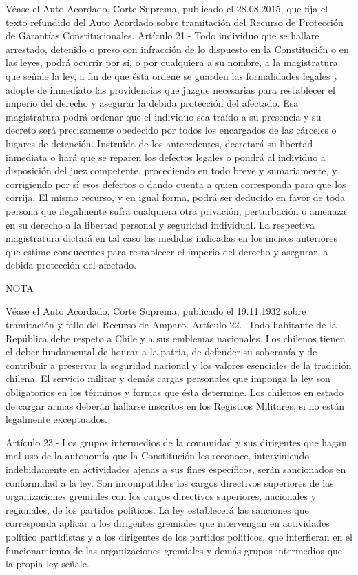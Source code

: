     Véase el Auto Acordado, Corte Suprema, publicado el 28.08.2015, que fija el texto refundido del Auto Acordado sobre tramitación del Recurso de Protección de Garantías Constitucionales.
    Artículo 21.- Todo individuo que se hallare arrestado, detenido o preso con infracción de lo dispuesto en la Constitución o en las leyes, podrá ocurrir por sí, o por cualquiera a su nombre, a la magistratura que señale la ley, a fin de que ésta ordene se guarden las formalidades legales y adopte de inmediato las providencias que juzgue necesarias para restablecer el imperio del derecho y asegurar la debida protección del afectado.
    Esa magistratura podrá ordenar que el individuo sea traído a su presencia y su decreto será precisamente obedecido por todos los encargados de las cárceles o lugares de detención. Instruida de los antecedentes, decretará su libertad inmediata o hará que se reparen los defectos legales o pondrá al individuo a disposición del juez competente, procediendo en todo breve y sumariamente, y corrigiendo por sí esos defectos o dando cuenta a quien corresponda para que los corrija.
    El mismo recurso, y en igual forma, podrá ser deducido en favor de toda persona que ilegalmente sufra cualquiera otra privación, perturbación o amenaza en su derecho a la libertad personal y seguridad individual. La respectiva magistratura dictará en tal caso las medidas indicadas en los incisos anteriores que estime conducentes para restablecer el imperio del derecho y asegurar la debida protección del afectado.




NOTA

    Véase el Auto Acordado, Corte Suprema, publicado el 19.11.1932 sobre tramitación y fallo del Recurso de Amparo.
    Artículo 22.- Todo habitante de la República debe respeto a Chile y a sus emblemas nacionales.
    Los chilenos tienen el deber fundamental de honrar a la patria, de defender su soberanía y de contribuir a preservar la seguridad nacional y los valores esenciales de la tradición chilena.
    El servicio militar y demás cargas personales que imponga la ley son obligatorios en los términos y formas que ésta determine.
    Los chilenos en estado de cargar armas deberán hallarse inscritos en los Registros Militares, si no están legalmente exceptuados.


    Artículo 23.- Los grupos intermedios de la comunidad y sus dirigentes que hagan mal uso de la autonomía que la Constitución les reconoce, interviniendo indebidamente en actividades ajenas a sus fines específicos, serán sancionados en conformidad a la ley. Son incompatibles los cargos directivos superiores de las organizaciones gremiales con los cargos directivos superiores, nacionales y regionales, de los partidos políticos.
    La ley establecerá las sanciones que corresponda aplicar a los dirigentes gremiales que intervengan en actividades político partidistas y a los dirigentes de los partidos políticos, que interfieran en el funcionamiento de las organizaciones gremiales y demás grupos intermedios que la propia ley señale.


